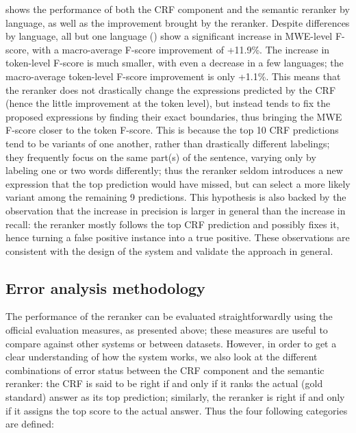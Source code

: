 \documentclass[output=paper,modfonts,nonflat]{langsci/langscibook}
\begin{document}
 shows the performance of both the CRF
component and the semantic reranker by language, as well as the
improvement brought by the reranker. Despite differences by language,
all but one language () show a significant increase in
MWE-level F-score, with a macro-average F-score improvement of
+11.9\%. The increase in token-level F-score is much smaller, with
even a decrease in a few languages; the macro-average token-level
F-score improvement is only +1.1\%. This means that the reranker does
not drastically change the expressions predicted by the CRF (hence the
little improvement at the token level), but instead tends to fix the
proposed expressions by finding their exact boundaries, thus bringing
the MWE F-score closer to the token F-score.  This is because the top
10 CRF predictions tend to be variants of one another, rather than
drastically different labelings; they frequently focus on the same
part(s) of the sentence, varying only by labeling one or two words
differently; thus the reranker seldom introduces a new expression that
the top prediction would have missed, but can select a more likely
variant among the remaining 9 predictions.  This hypothesis is also
backed by the observation that the increase in precision is larger in
general than the increase in recall: the reranker mostly follows the
top CRF prediction and possibly fixes it, hence turning a false
positive instance into a true positive.  These observations are
consistent with the design of the system and validate the 
approach in general.





\subsection{Error analysis methodology}

\label{moreau:sec:methodology}

The performance of the reranker can be evaluated straightforwardly
using the official evaluation measures, as presented above; these
measures are useful to compare against other systems or between
datasets. However, in order to get a clear understanding of how the
system works, we also look at the different combinations of error
status between the CRF component and the semantic reranker: the CRF is
said to be right if and only if it ranks the actual (gold standard)
answer as its top prediction; similarly, the reranker is right if and
only if it assigns the top score to the actual answer. Thus the four
following categories are defined:
\end{document}
